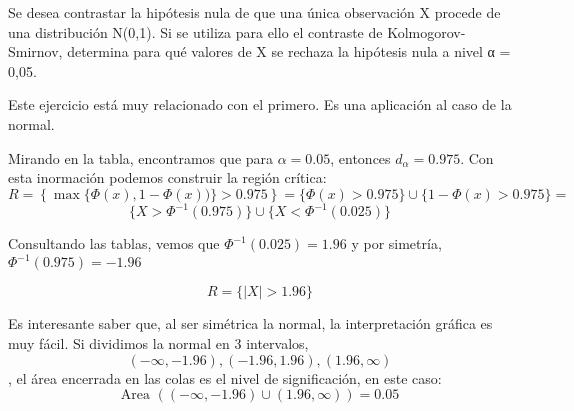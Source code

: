 \begin{problem}[2] Se desea contrastar la hipótesis nula de que una única observación X procede de una distribución N(0,1). Si se utiliza para ello el contraste de Kolmogorov-Smirnov, determina para qué valores de X se rechaza la hipótesis nula a nivel α = 0,05.
\solution

Este ejercicio está muy relacionado con el primero. Es una aplicación al caso de la normal.


Mirando en la tabla, encontramos que para $α = 0.05$, entonces $d_α = 0.975$. Con esta inormación podemos construir la región crítica:
\[ R = \left\{\max\{\Phi(x), 1 - \Phi(x))\} > 0.975\right\} = \{\Phi(x) > 0.975\} \cup \{1 - \Phi(x) > 0.975\} =\]
\[ \{ X>\Phi^{-1}(0.975)\} \cup \{X < \Phi^{-1}(0.025)\}\]

Consultando las tablas, vemos que $\Phi^{-1}(0.025) = 1.96$ y por simetría, $\Phi^{-1}(0.975) = -1.96$

\[R = \{|X| > 1.96\}\]


\obs Es interesante saber que, al ser simétrica la normal, la interpretación gráfica es muy fácil. Si dividimos la normal en 3 intervalos, \[(-∞ , -1.96) , (-1.96,1.96) , (1.96, ∞)\], el área encerrada en las colas es el nivel de significación, en este caso: \[\text{Area }\left((-∞ , -1.96)\cup (1.96, ∞)\right) = 0.05\]

\end{problem}



